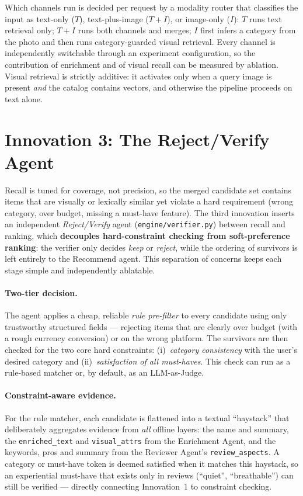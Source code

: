 Which channels run is decided per request by a modality router that classifies
the input as text-only ($T$), text-plus-image ($T{+}I$), or image-only ($I$):
$T$ runs text retrieval only; $T{+}I$ runs both channels and merges; $I$ first
infers a category from the photo and then runs category-guarded visual
retrieval. Every channel is independently switchable through an experiment
configuration, so the contribution of enrichment and of visual recall can be
measured by ablation. Visual retrieval is strictly additive: it activates only
when a query image is present \emph{and} the catalog contains vectors, and
otherwise the pipeline proceeds on text alone.

\section{Innovation 3: The Reject/Verify Agent}
\label{sec:innov-reject}

Recall is tuned for coverage, not precision, so the merged candidate set contains
items that are visually or lexically similar yet violate a hard requirement
(wrong category, over budget, missing a must-have feature). The third innovation
inserts an independent \emph{Reject/Verify} agent (\texttt{engine/verifier.py})
between recall and ranking, which \textbf{decouples hard-constraint checking from
soft-preference ranking}: the verifier only decides \emph{keep} or \emph{reject},
while the ordering of survivors is left entirely to the Recommend agent. This
separation of concerns keeps each stage simple and independently ablatable.

\paragraph{Two-tier decision.}
The agent applies a cheap, reliable \emph{rule pre-filter} to every candidate
using only trustworthy structured fields --- rejecting items that are clearly
over budget (with a rough currency conversion) or on the wrong platform. The
survivors are then checked for the two core hard constraints: (i)~\emph{category
consistency} with the user's desired category and (ii)~\emph{satisfaction of all
must-haves}. This check can run as a rule-based matcher or, by default, as an
LLM-as-Judge.

\paragraph{Constraint-aware evidence.}
For the rule matcher, each candidate is flattened into a textual ``haystack''
that deliberately aggregates evidence from \emph{all} offline layers: the name
and summary, the \texttt{enriched\_text} and \texttt{visual\_attrs} from the
Enrichment Agent, and the keywords, pros and summary from the Reviewer Agent's
\texttt{review\_aspects}. A category or must-have token is deemed satisfied when
it matches this haystack, so an experiential must-have that exists only in
reviews (``quiet'', ``breathable'') can still be verified --- directly
connecting Innovation~1 to constraint checking.

